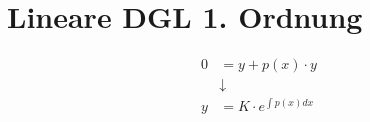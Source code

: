 \documentclass[a4paper]{fhnwreport} %
\begin{document}
\section{Lineare DGL 1. Ordnung}

\begin{center}
\begin{align*}
0 &= y + p(x)\cdot y \\
&\downarrow \\
y &= K\cdot e^{\int p(x)dx}
\end{align*}
\end{center}
\end{document}
